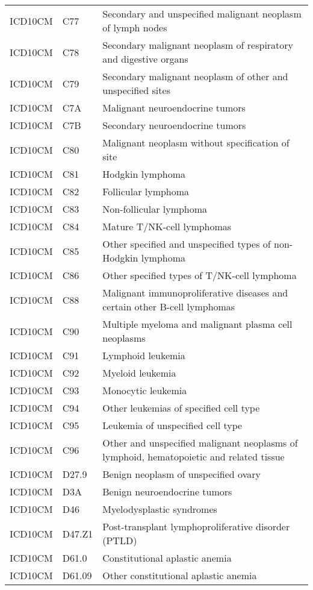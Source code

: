 \begin{longtable}{p{}p{}p{}}
  ICD10CM & C77 & Secondary and unspecified malignant neoplasm of lymph nodes \\ 
  ICD10CM & C78 & Secondary malignant neoplasm of respiratory and digestive organs \\ 
  ICD10CM & C79 & Secondary malignant neoplasm of other and unspecified sites \\ 
  ICD10CM & C7A & Malignant neuroendocrine tumors \\ 
  ICD10CM & C7B & Secondary neuroendocrine tumors \\ 
  ICD10CM & C80 & Malignant neoplasm without specification of site \\ 
  ICD10CM & C81 & Hodgkin lymphoma \\ 
  ICD10CM & C82 & Follicular lymphoma \\ 
  ICD10CM & C83 & Non-follicular lymphoma \\ 
  ICD10CM & C84 & Mature T/NK-cell lymphomas \\ 
  ICD10CM & C85 & Other specified and unspecified types of non-Hodgkin lymphoma \\ 
  ICD10CM & C86 & Other specified types of T/NK-cell lymphoma \\ 
  ICD10CM & C88 & Malignant immunoproliferative diseases and certain other B-cell lymphomas \\ 
  ICD10CM & C90 & Multiple myeloma and malignant plasma cell neoplasms \\ 
  ICD10CM & C91 & Lymphoid leukemia \\ 
  ICD10CM & C92 & Myeloid leukemia \\ 
  ICD10CM & C93 & Monocytic leukemia \\ 
  ICD10CM & C94 & Other leukemias of specified cell type \\ 
  ICD10CM & C95 & Leukemia of unspecified cell type \\ 
  ICD10CM & C96 & Other and unspecified malignant neoplasms of lymphoid, hematopoietic and related tissue \\ 
  ICD10CM & D27.9 & Benign neoplasm of unspecified ovary \\ 
  ICD10CM & D3A & Benign neuroendocrine tumors \\ 
  ICD10CM & D46 & Myelodysplastic syndromes \\ 
  ICD10CM & D47.Z1 & Post-transplant lymphoproliferative disorder (PTLD) \\ 
  ICD10CM & D61.0 & Constitutional aplastic anemia \\ 
  ICD10CM & D61.09 & Other constitutional aplastic anemia \\ 

\end{longtable}
